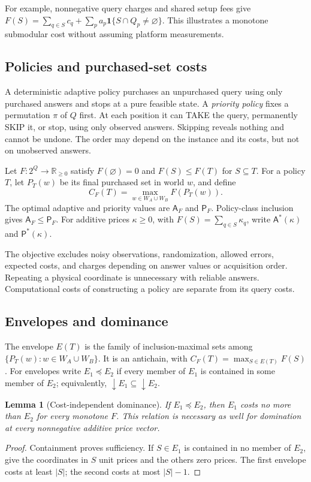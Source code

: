 \documentclass[pdflatex,sn-mathphys-num]{sn-jnl}
\newcommand{\A}{\mathsf{A}}
\newcommand{\Pcost}{\mathsf{P}}
\newcommand{\down}{\mathop{\downarrow}}
\theoremstyle{thmstyleone}
\newtheorem{lemma}[theorem]{Lemma}
\theoremstyle{thmstylethree}
\theoremstyle{thmstyletwo}
\begin{document}
For example, nonnegative query charges and shared setup fees give
$F(S)=\sum_{q\in S}c_q+\sum_p a_p\mathbf1\{S\cap Q_p\ne\varnothing\}$.
This illustrates a monotone submodular cost without assuming platform measurements.

\subsection{Policies and purchased-set costs}
A deterministic adaptive policy purchases an unpurchased query using only purchased answers and stops at a pure feasible state. A \emph{priority policy} fixes a permutation $\pi$ of $Q$ first. At each position it can TAKE the query, permanently SKIP it, or stop, using only observed answers. Skipping reveals nothing and cannot be undone. The order may depend on the instance and its costs, but not on unobserved answers.

Let $F:2^Q\to\mathbb R_{\geq0}$ satisfy $F(\varnothing)=0$ and $F(S)\leq F(T)$ for $S\subseteq T$. For a policy $T$, let $P_T(w)$ be its final purchased set in world $w$, and define
\[
 C_F(T)=\max_{w\in W_A\cup W_B} F(P_T(w)).
\]
The optimal adaptive and priority values are $\A_F$ and $\Pcost_F$. Policy-class inclusion gives $\A_F\leq\Pcost_F$. For additive prices $\kappa\geq0$, with $F(S)=\sum_{q\in S}\kappa_q$, write $\A^*(\kappa)$ and $\Pcost^*(\kappa)$.

The objective excludes noisy observations, randomization, allowed errors, expected costs, and charges depending on answer values or acquisition order. Repeating a physical coordinate is unnecessary with reliable answers. Computational costs of constructing a policy are separate from its query costs.

\subsection{Envelopes and dominance}\label{sec:envelopes}
The envelope $E(T)$ is the family of inclusion-maximal sets among $\{P_T(w):w\in W_A\cup W_B\}$. It is an antichain, with $C_F(T)=\max_{S\in E(T)}F(S)$. For envelopes write $E_1\preceq E_2$ if every member of $E_1$ is contained in some member of $E_2$; equivalently, $\down E_1\subseteq\down E_2$.

\begin{lemma}[Cost-independent dominance]\label{lem:dominance}
If $E_1\preceq E_2$, then $E_1$ costs no more than $E_2$ for every monotone $F$. This relation is necessary as well for domination at every nonnegative additive price vector.
\end{lemma}
\begin{proof}
Containment proves sufficiency. If $S\in E_1$ is contained in no member of $E_2$, give the coordinates in $S$ unit prices and the others zero prices. The first envelope costs at least $|S|$; the second costs at most $|S|-1$.
\end{proof}
\end{document}
